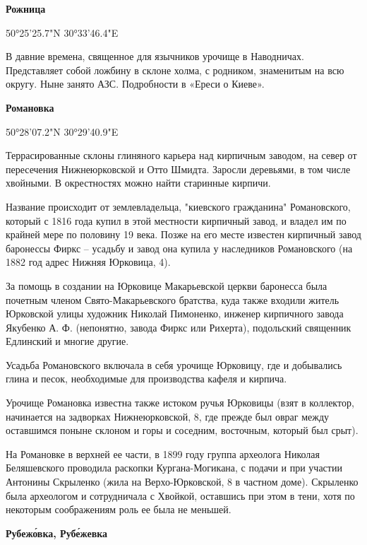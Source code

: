 \medskip

\textbf{Рожница} 

50°25'25.7"N 30°33'46.4"E

В давние времена, священное для язычников урочище в Наводничах. Представляет собой ложбину в склоне холма, с родником, знаменитым на всю округу. Ныне занято АЗС. Подробности в «Ереси о Киеве».\\

\medskip

\textbf{Романовка} 

50°28'07.2"N 30°29'40.9"E

Террасированные склоны глиняного карьера над кирпичным заводом, на север от пересечения Нижнеюрковской и Отто Шмидта. Заросли деревьями, в том числе хвойными. В окрестностях можно найти старинные кирпичи.

Название происходит от землевладельца, "киевского гражданина" Романовского, который с 1816 года купил в этой местности кирпичный завод, и владел им по крайней мере по половину 19 века. Позже на его месте известен кирпичный завод баронессы Фиркс – усадьбу и завод она купила у наследников Романовского (на 1882 год адрес Нижняя Юрковица, 4).

За помощь в создании на Юрковице Макарьевской церкви баронесса была почетным членом Свято-Макарьевского братства, куда также входили житель Юрковской улицы художник Николай Пимоненко, инженер кирпичного завода Якубенко А. Ф. (непонятно, завода Фиркс или Рихерта), подольский священник Едлинский и многие другие.

Усадьба Романовского включала в себя урочище Юрковицу, где и добывались глина и песок, необходимые для производства кафеля и кирпича.

Урочище Романовка известна также истоком ручья Юрковицы (взят в коллектор, начинается на задворках Нижнеюрковской, 8, где прежде был овраг между оставшимся поныне склоном и горы и соседним, восточным, который был срыт).

На Романовке в верхней ее части, в 1899 году группа археолога Николая Беляшевского   проводила раскопки Кургана-Могикана, с подачи и при участии Антонины Скрыленко (жила на Верхо-Юрковской, 8 в частном доме). Скрыленко была археологом и сотрудничала с Хвойкой, оставшись при этом в тени, хотя по некоторым соображениям роль ее была не меньшей.\\

\medskip
  
\textbf{Рубеж\'овка, Руб\'ежевка} 

